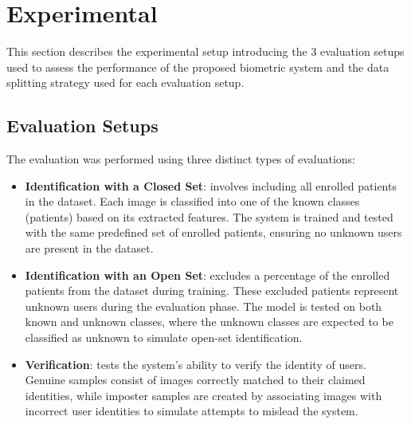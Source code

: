 
\section{Experimental}
This section describes the experimental setup introducing the 3 evaluation setups used to assess the performance of the proposed biometric system and the data splitting strategy used for each evaluation setup.

\subsection{Evaluation Setups}
The evaluation was performed using three distinct types of evaluations:

\begin{itemize}
    \item \textbf{Identification with a Closed Set}: involves including all enrolled patients in the dataset. Each image is classified into one of the known classes (patients) based on its extracted features. The system is trained and tested with the same predefined set of enrolled patients, ensuring no unknown users are present in the dataset.

    \item \textbf{Identification with an Open Set}: excludes a percentage of the enrolled patients from the dataset during training. These excluded patients represent unknown users during the evaluation phase. The model is tested on both known and unknown classes, where the unknown classes are expected to be classified as unknown to simulate open-set identification.

    \item \textbf{Verification}: tests the system's ability to verify the identity of users. Genuine samples consist of images correctly matched to their claimed identities, while imposter samples are created by associating images with incorrect user identities to simulate attempts to mislead the system.
\end{itemize}

